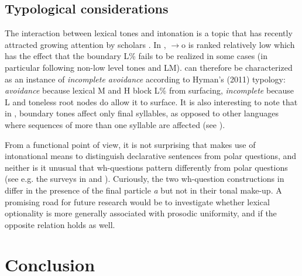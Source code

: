 \documentclass[output=paper,newtxmath,modfonts,nonflat,hidelinks]{langsci/langscibook}
\begin{document}
\subsection{Typological considerations}
The interaction between lexical tones and intonation is a topic that has recently attracted growing attention by scholars \citep{Hyman.2011,Gussenhoven.2014.WorldEnglishes,DowningRialland16}.
In , \textrho$\to$o is ranked relatively low which has the effect that the boundary  L\% fails to be realized in some cases (in particular following non-low level tones and LM).
 can therefore be characterized as an instance of \textit{incomplete avoidance} according to Hyman's (2011) typology:
\textit{avoidance} because lexical M and H block L\% from surfacing, \textit{incomplete} because L and toneless root nodes do allow it to surface.
It is also interesting to note that in , boundary tones affect only final syllables, as opposed to other languages where sequences of more than one syllable are affected (see \citealt{KulaHaman.2017}).

From a functional point of view, it is not surprising that  makes use of intonational means to distinguish declarative sentences from polar questions,
and neither is it unusual that wh-questions pattern differently from polar questions (see e.g. the surveys in \citealt{Chisholm.1984} and \citealt{Jun.2005}). %
Curiously, the two wh-question constructions in  differ in the presence of the final particle \textit{a} but not in their tonal make-up.
A promising road for future research would be to investigate whether lexical optionality is more generally associated with prosodic uniformity, and if the opposite relation holds as well.


\section{Conclusion}\label{sec:gjersoe:5}
\end{document}
